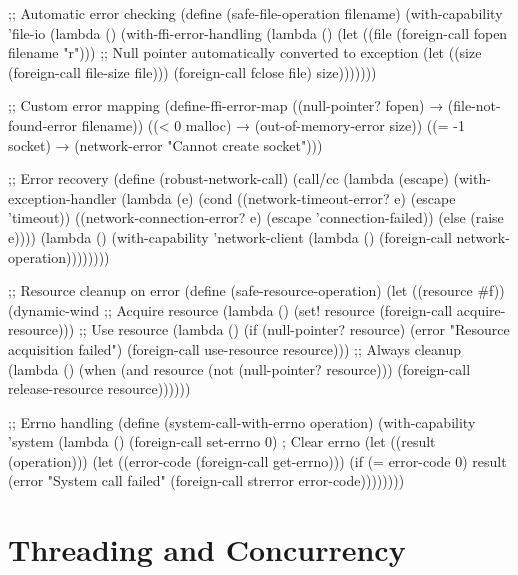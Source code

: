 \begin{example}
\begin{lambdustcode}
;; Automatic error checking
(define (safe-file-operation filename)
  (with-capability 'file-io
    (lambda ()
      (with-ffi-error-handling
        (lambda ()
          (let ((file (foreign-call fopen filename "r")))
            ;; Null pointer automatically converted to exception
            (let ((size (foreign-call file-size file)))
              (foreign-call fclose file)
              size)))))))

;; Custom error mapping
(define-ffi-error-map
  ((null-pointer? fopen) → (file-not-found-error filename))
  ((< 0 malloc) → (out-of-memory-error size))
  ((= -1 socket) → (network-error "Cannot create socket")))

;; Error recovery
(define (robust-network-call)
  (call/cc 
    (lambda (escape)
      (with-exception-handler
        (lambda (e)
          (cond 
            ((network-timeout-error? e)
             (escape 'timeout))
            ((network-connection-error? e)
             (escape 'connection-failed))
            (else (raise e))))
        (lambda ()
          (with-capability 'network-client
            (lambda () 
              (foreign-call network-operation))))))))

;; Resource cleanup on error
(define (safe-resource-operation)
  (let ((resource #f))
    (dynamic-wind
      ;; Acquire resource
      (lambda ()
        (set! resource (foreign-call acquire-resource)))
      ;; Use resource  
      (lambda ()
        (if (null-pointer? resource)
            (error "Resource acquisition failed")
            (foreign-call use-resource resource)))
      ;; Always cleanup
      (lambda ()
        (when (and resource (not (null-pointer? resource)))
          (foreign-call release-resource resource))))))

;; Errno handling
(define (system-call-with-errno operation)
  (with-capability 'system
    (lambda ()
      (foreign-call set-errno 0)  ; Clear errno
      (let ((result (operation)))
        (let ((error-code (foreign-call get-errno)))
          (if (= error-code 0)
              result
              (error "System call failed" 
                     (foreign-call strerror error-code))))))))
\end{lambdustcode}
\end{example}

\section{Threading and Concurrency}
\label{sec:ffi-threading}

